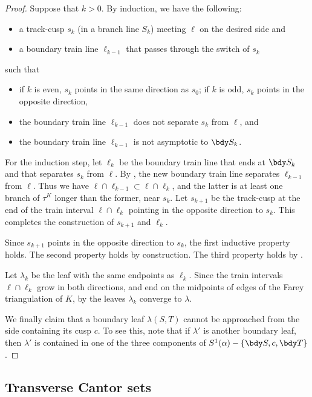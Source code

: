 \documentclass[12pt]{amsart}
\begin{document}
\begin{proof}
Suppose that $k>0$.  By induction, we have the following:
\begin{itemize}
\item a track-cusp $s_k$ (in a branch line $S_k$) meeting $\ell$ on the desired side and
\item a boundary train line $\ell_{k-1}$ that passes through the switch of $s_k$
\end{itemize}
such that
\begin{itemize}
\item if $k$ is even, $s_k$ points in the same direction as $s_0$; if $k$ is odd, $s_k$ points in the opposite direction,
\item the boundary train line $\ell_{k-1}$ does not separate $s_k$ from $\ell$, and
\item the boundary train line $\ell_{k-1}$ is not asymptotic to $\bdy S_k$.
\end{itemize}

For the induction step, let $\ell_k$ be the boundary train line that ends at $\bdy S_k$ and that separates $s_k$ from $\ell$. By , the new boundary train line separates $\ell_{k-1}$ from $\ell$. Thus we have $\ell \cap \ell_{k-1} \subset \ell \cap \ell_k$, and the latter is at least one branch of $\tau^K$ longer than the former, near $s_k$. Let $s_{k+1}$ be the track-cusp at the end of the train interval $\ell \cap \ell_k$ pointing in the opposite direction to $s_k$.  
This completes the construction of $s_{k+1}$ and $\ell_k$. 

Since $s_{k+1}$ points in the opposite direction to $s_k$, the first inductive property holds. The second property holds by construction. The third property holds by .

Let $\lambda_k$ be the leaf with the same endpoints as $\ell_k$. Since the train intervals $\ell \cap \ell_k$ grow in both directions, and end on the midpoints of edges of the Farey triangulation of $K$, by  the leaves $\lambda_k$ converge to $\lambda$. 

We finally claim that a boundary leaf $\lambda(S, T)$ cannot be approached from the side containing its cusp $c$. To see this, note that if $\lambda'$ is another boundary leaf, then $\lambda'$ is contained in one of the three components of $S^1(\alpha) - \{\bdy S, c, \bdy T\}$.
\end{proof}



\subsection{Transverse Cantor sets}
\label{Sec:Cantor}
\end{document}
